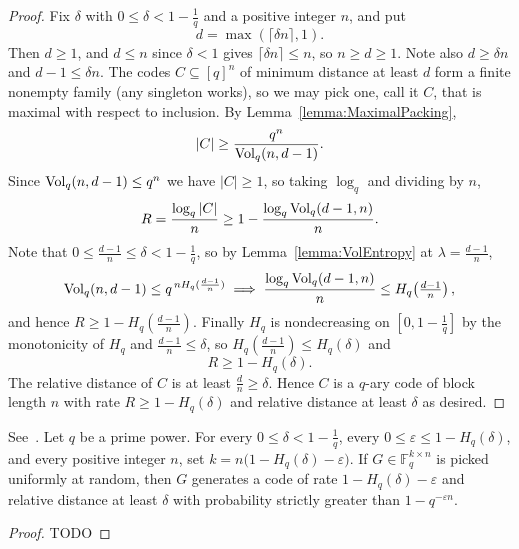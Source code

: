\begin{proof}
    \leanok
    Fix $\delta$ with $0 \leq \delta < 1 - \frac{1}{q}$ and a positive integer $n$, and put
    \[
      d = \max(\lceil \delta n \rceil, 1).
    \]
    Then $d \geq 1$, and $d \leq n$ since $\delta < 1$ gives $\lceil \delta n \rceil \leq n$, so $n \geq d \geq 1$. Note also $d \geq \delta n$ and $d - 1 \leq \delta n$.
    The codes $C \subseteq [q]^{n}$ of minimum distance at least $d$ form a finite nonempty family (any singleton works), so we may pick one, call it $C$, that is maximal with respect to inclusion.
    By Lemma~\ref{lemma:MaximalPacking},
    \[
      |C| \geq \frac{q^{n}}{\operatorname{Vol}_{q}(n,d-1)}.
    \]
    Since $\operatorname{Vol}_{q}(n,d-1) \leq q^{n}$ we have $|C| \geq 1$, so taking $\log_{q}$ and dividing by $n$,
    \[
      R = \frac{\log_{q}|C|}{n} \geq 1 - \frac{\log_{q}\operatorname{Vol}_{q}(d-1,n)}{n}.
    \]
    Note that $0 \leq \frac{d-1}{n} \leq \delta < 1 - \frac{1}{q}$, so by Lemma~\ref{lemma:VolEntropy} at $\lambda = \frac{d-1}{n}$,
    \[
      \operatorname{Vol}_{q}(n,d-1) \leq q^{\,n H_q(\frac{d-1}{n})} \implies \frac{\log_{q}\operatorname{Vol}_{q}(d-1,n)}{n} \leq H_q\!\left(\tfrac{d-1}{n}\right),
    \]
    and hence $R \geq 1 - H_q(\frac{d-1}{n})$. Finally $H_q$ is nondecreasing on $[0, 1 - \frac{1}{q}]$ by the monotonicity of $H_q$ and $\frac{d-1}{n} \leq \delta$, so $H_q(\frac{d-1}{n}) \leq H_q(\delta)$ and
    \[
      R \geq 1 - H_q(\delta).
    \]
    The relative distance of $C$ is at least $\frac{d}{n} \geq \delta$.
    Hence $C$ is a $q$-ary code of block length $n$ with rate $R \geq 1 - H_q(\delta)$ and relative distance at least $\delta$ as desired.
\end{proof}

\begin{theorem}
See~\cite{GRS}.
Let $q$ be a prime power.
For every $0 \leq \delta < 1 - \frac{1}{q}$, every $0 \leq \varepsilon \leq 1 - H_q(\delta)$, and every positive integer $n$, set $k = n\bigl(1 - H_q(\delta) - \varepsilon\bigr)$.
If $G \in \mathbb{F}^{k \times n}_{q}$ is picked uniformly at random, then $G$ generates a code of rate $1 - H_q(\delta) - \varepsilon$ and relative distance at least $\delta$ with probability strictly greater than $1 - q^{-\varepsilon n}$.
\end{theorem}

\begin{proof}
    TODO
\end{proof}
